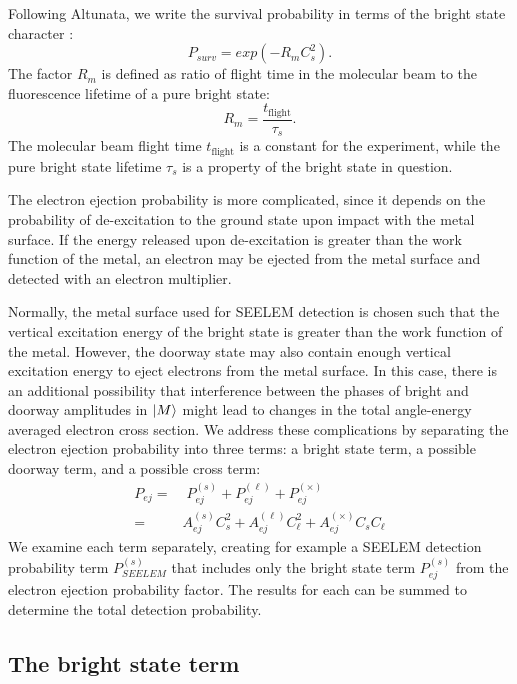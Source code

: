\documentclass[12pt]{mitthesis}
\begin{document}
Following Altunata, we write the survival probability
in terms of the bright state character \cite{altunata00}:
\begin{equation}
  P_{surv} = exp \left( -R_m C_s^2 \right).
\end{equation}
The factor $R_m$ is defined as ratio of flight time in the molecular
beam to the fluorescence lifetime of a pure bright state:
\begin{equation}
  R_m = \frac{t_{\text{flight}}}{\tau_s}.
\end{equation}
The molecular beam flight time $t_{\text{flight}}$ is a constant for
the experiment, while the pure bright state lifetime $\tau_s$ is a
property of the bright state in question.

The electron ejection probability is more complicated, since it
depends on the probability of de-excitation to the ground state upon
impact with the metal surface.  If the energy released upon
de-excitation is greater than the work function of the metal, an
electron may be ejected from the metal surface and detected with an
electron multiplier.

Normally, the metal surface used for SEELEM detection is chosen such
that the vertical excitation energy of the bright state is greater
than the work function of the metal. However, the doorway state may
also contain enough vertical excitation energy to eject electrons from
the metal surface. In this case, there is an additional possibility
that interference between the phases of bright and doorway amplitudes
in $\mathinner{|{M}\rangle}$ might lead to changes in the total angle-energy averaged
electron cross section. We address these complications by separating
the electron ejection probability into three terms: a bright state
term, a possible doorway term, and a possible cross term:
\begin{equation}
  \begin{split}
    P_{ej} =& \; P_{ej}^{(s)} + P_{ej}^{(\ell)} + P_{ej}^{(\times)}\\ 
    =& A_{ej}^{(s)} C_s^2 + A_{ej}^{(\ell)} C_\ell^2 + A_{ej}^{(\times)} C_s C_\ell
  \end{split}
\end{equation}
We examine each term separately, creating for example a SEELEM
detection probability term $P_{SEELEM}^{(s)}$ that includes only the
bright state term $P_{ej}^{(s)}$ from the electron ejection
probability factor.  The results for each can be summed to determine
the total detection probability.

\subsection{The bright state term}
\label{sec:bright-state-term}
\end{document}
